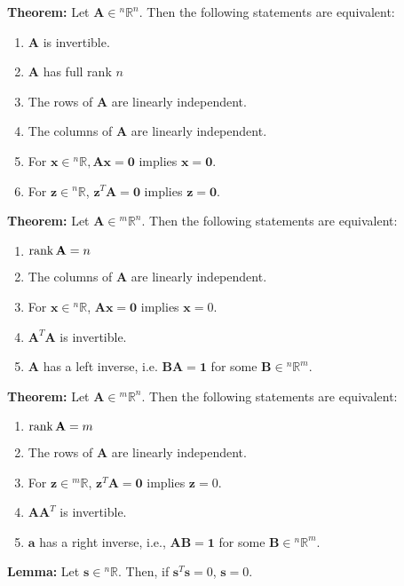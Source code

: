 \documentclass{article}
\newcommand{\bff}[1]{\mathbf{#1}}
\begin{document}
    \begin{minipage}[t]{.45\textwidth} %
        \textbf{Theorem:} Let $\bff{A} \in {^n}\mathbb{R}^n$. Then the following statements are equivalent:
        \begin{enumerate}
            \item $\bff{A}$ is invertible.
            \item $\bff{A}$ has full rank $n$
            \item The rows of $\bff{A}$ are linearly independent.
            \item The columns of $\bff{A}$ are linearly independent.
            \item For $\bff{x} \in {^n}\mathbb{R}, \bff{Ax}=\bff{0}$ implies $\bff{x}=\bff{0}$.
            \item For $\bff{z} \in {^n}\mathbb{R}$, $\bff{z}^T\bff{A} = \bff{0}$ implies $\bff{z}=\bff{0}$.
        \end{enumerate}
        \vspace{2mm}
        
        \textbf{Theorem:} Let $\bff{A} \in {^m}\mathbb{R}^n$. Then the following statements are equivalent:
        \begin{enumerate}
            \item $\rank \bff{A} = n$
            \item The columns of $\bff{A}$ are linearly independent.
            \item For $\bff{x} \in {^n}\mathbb{R}$, $\bff{Ax}=\bff{0}$ implies $\bff{x}=0$.
            \item $\bff{A}^T\bff{A}$ is invertible.
            \item $\bff{A}$ has a left inverse, i.e. $\bff{BA}=\bff{1}$ for some $\bff{B} \in {^n}\mathbb{R}^m$.
        \end{enumerate}
        \vspace{2mm}
        \textbf{Theorem:} Let $\bff{A} \in {^m}\mathbb{R}^n.$ Then the following statements are equivalent:
        \begin{enumerate}
            \item $\rank \bff{A} = m$
            \item The rows of $\bff{A}$ are linearly independent.
            \item For $\bff{z} \in {^m}\mathbb{R}$, $\bff{z}^T\bff{A} = \bff{0}$ implies $\bff{z}=0$.
            \item $\bff{AA}^T$ is invertible.
            \item $\bff{a}$ has a right inverse, i.e., $\bff{AB}=\bff{1}$ for some $\bff{B} \in {^n}\mathbb{R}^m$.
        \end{enumerate}
        \textbf{Lemma:} Let $\bff{s} \in {^n}\mathbb{R}$. Then, if $\bff{s}^T\bff{s}=0$, $\bff{s}=0$.
        \vspace{2mm}


    \end{minipage} %
\end{document}

